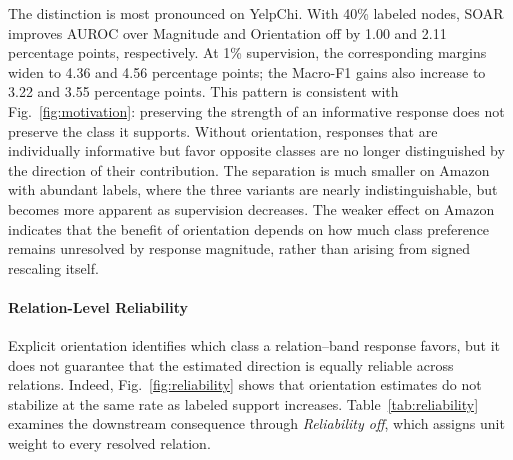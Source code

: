 \documentclass[10pt,journal]{IEEEtran}
\begin{document}
The distinction is most pronounced on YelpChi. With 40\% labeled nodes,
SOAR improves AUROC over Magnitude and Orientation off by 1.00 and
2.11 percentage points, respectively. At 1\% supervision, the corresponding
margins widen to 4.36 and 4.56 percentage points; the Macro-F1 gains also
increase to 3.22 and 3.55 percentage points. This pattern is consistent with
Fig.~\ref{fig:motivation}: preserving the strength of an informative response
does not preserve the class it supports. Without orientation, responses that
are individually informative but favor opposite classes are no longer
distinguished by the direction of their contribution. The separation is much smaller on Amazon with abundant labels, where the
three variants are nearly indistinguishable, but becomes more apparent as
supervision decreases. The weaker effect on Amazon indicates that the benefit
of orientation depends on how much class preference remains unresolved by
response magnitude, rather than arising from signed rescaling itself.

\begin{table}[!h]
\centering
\caption{Effect of relation-level reliability under abundant and scarce
supervision. All entries are mean AUROC and Macro-F1 (\%).}
\label{tab:reliability}
\scriptsize
\setlength{\tabcolsep}{2.8pt}
\renewcommand{\arraystretch}{1.10}
\end{table}

\paragraph{Relation-Level Reliability}
Explicit orientation identifies which class a relation--band response favors,
but it does not guarantee that the estimated direction is equally reliable
across relations. Indeed, Fig.~\ref{fig:reliability} shows that orientation
estimates do not stabilize at the same rate as labeled support increases.
Table~\ref{tab:reliability} examines the downstream consequence through
\emph{Reliability off}, which assigns unit weight to every resolved relation.
\end{document}
